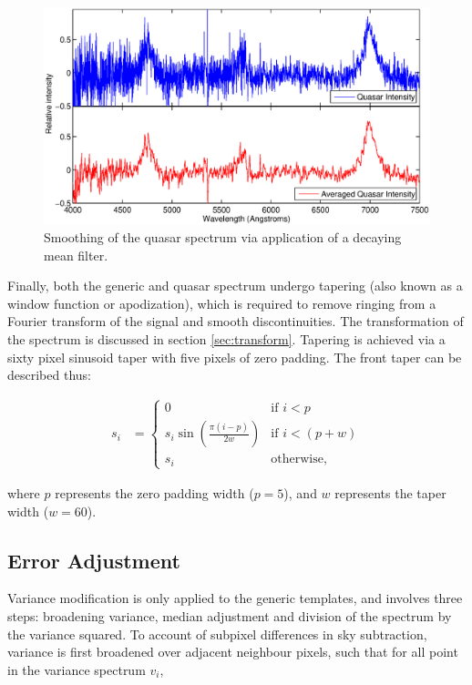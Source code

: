 \documentclass[titlesmallcaps, examinerscopy, copyrightpage]{uqthesis}
\newcommand{\brac}[1]{\left( #1 \right)}
\begin{document}
\begin{figure}[ht!]
\includegraphics[width=1\textwidth]{images/quasarAverage.eps} 
\centering
\caption{Smoothing of the quasar spectrum via application of a decaying mean filter.}
\label{fig:quasar}
\end{figure}


Finally, both the generic and quasar spectrum undergo tapering (also known as a window function or apodization), which is required to remove ringing from a Fourier transform  of the signal and smooth discontinuities. The transformation of the spectrum is discussed in section \ref{sec:transform}. Tapering is achieved via a sixty pixel sinusoid taper with five pixels of zero padding. The front taper can be described thus:


\begin{align}
s_i &= 
\begin{cases}
	0 & \text{if } i < p \\
	s_i \sin\brac{\frac{\pi (i-p)}{2w}} & \text{if } i < (p+w) \\
	s_i & \text{otherwise},
\end{cases}
\end{align} 

where $p$ represents the zero padding width ($p=5$), and $w$ represents the taper width ($w=60$).

\subsection{Error Adjustment}

Variance modification is only applied to the generic templates, and involves three steps: broadening variance, median adjustment and division of the spectrum by the variance squared. To account of subpixel differences in sky subtraction, variance is first broadened over adjacent neighbour pixels, such that for all point in the variance spectrum $v_i$, 
\end{document}
